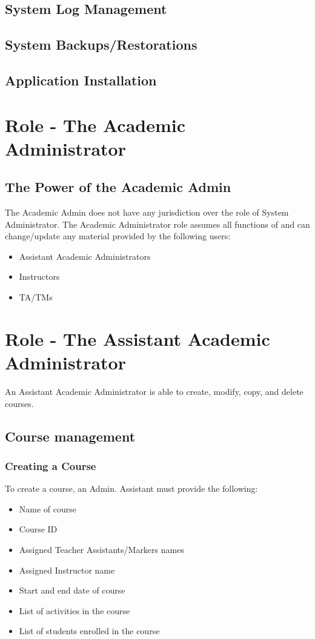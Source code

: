 \documentclass{article}
\begin{document}
\subsection{System Log Management}
\subsection{System Backups/Restorations}
\subsection{Application Installation}

\section{Role - The Academic Administrator}
\subsection{The Power of the Academic Admin}
The Academic Admin does not have any jurisdiction over the role of System Administrator.
The Academic Administrator role assumes all functions of and can change/update any material
provided by the following users:
\begin{itemize}
  \item Assistant Academic Administrators
  \item Instructors
  \item TA/TMs
\end{itemize}

\section{Role - The Assistant Academic Administrator}
An Assistant Academic Administrator is able to create, modify, copy, and delete courses.
\subsection {Course management}
\subsubsection{Creating a Course}
To create a course, an Admin. Assistant must provide the following:
\begin{itemize}
	\item Name of course
	\item Course ID
	\item Assigned Teacher Assistants/Markers names
	\item Assigned Instructor name
	\item Start and end date of course
	\item List of activities in the course
	\item List of students enrolled in the course
\end{itemize}
\end{document}
